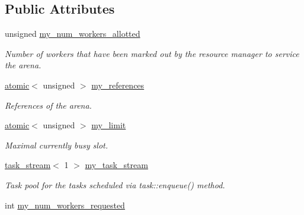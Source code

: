 \subsection*{Public Attributes}
\begin{DoxyCompactItemize}
\item 
\hypertarget{structtbb_1_1internal_1_1arena__base_a5db92c4ad3061c5cf83425507ed9446e}{}unsigned \hyperlink{structtbb_1_1internal_1_1arena__base_a5db92c4ad3061c5cf83425507ed9446e}{my\+\_\+num\+\_\+workers\+\_\+allotted}\label{structtbb_1_1internal_1_1arena__base_a5db92c4ad3061c5cf83425507ed9446e}

\begin{DoxyCompactList}\small\item\em Number of workers that have been marked out by the resource manager to service the arena. \end{DoxyCompactList}\item 
\hyperlink{structtbb_1_1atomic}{atomic}$<$ unsigned $>$ \hyperlink{structtbb_1_1internal_1_1arena__base_afda80ce7337049bd96b883cef6e8483e}{my\+\_\+references}
\begin{DoxyCompactList}\small\item\em References of the arena. \end{DoxyCompactList}\item 
\hypertarget{structtbb_1_1internal_1_1arena__base_a0184ffea730d663e63f0f60946422da2}{}\hyperlink{structtbb_1_1atomic}{atomic}$<$ unsigned $>$ \hyperlink{structtbb_1_1internal_1_1arena__base_a0184ffea730d663e63f0f60946422da2}{my\+\_\+limit}\label{structtbb_1_1internal_1_1arena__base_a0184ffea730d663e63f0f60946422da2}

\begin{DoxyCompactList}\small\item\em Maximal currently busy slot. \end{DoxyCompactList}\item 
\hyperlink{classtbb_1_1internal_1_1task__stream}{task\+\_\+stream}$<$ 1 $>$ \hyperlink{structtbb_1_1internal_1_1arena__base_a2aefd9085b89be7e4c31820197697358}{my\+\_\+task\+\_\+stream}
\begin{DoxyCompactList}\small\item\em Task pool for the tasks scheduled via task\+::enqueue() method. \end{DoxyCompactList}\item 
\hypertarget{structtbb_1_1internal_1_1arena__base_a8e346bbed329804473efe0f8080c9e8b}{}int \hyperlink{structtbb_1_1internal_1_1arena__base_a8e346bbed329804473efe0f8080c9e8b}{my\+\_\+num\+\_\+workers\+\_\+requested}\label{structtbb_1_1internal_1_1arena__base_a8e346bbed329804473efe0f8080c9e8b}


\end{DoxyCompactItemize}
